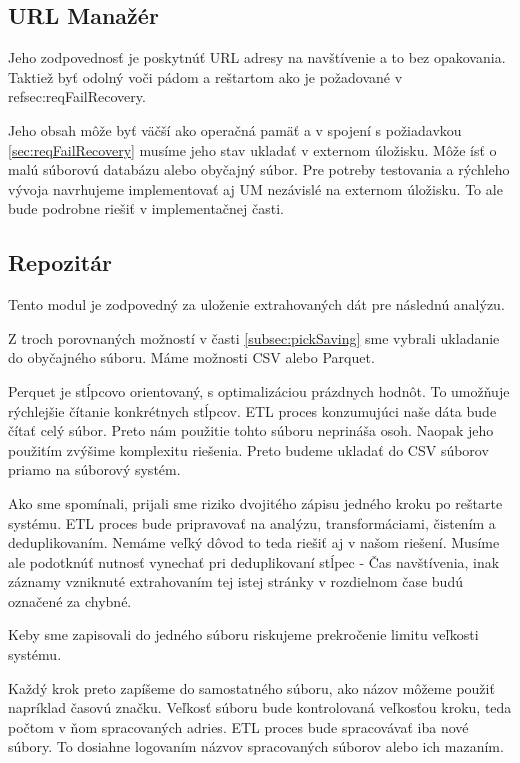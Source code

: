 \subsection{URL Manažér}
Jeho zodpovednosť je poskytnúť URL adresy na navštívenie a to bez opakovania. Taktiež byť odolný voči pádom a reštartom ako je požadované v ref{sec:reqFailRecovery}.

Jeho obsah môže byť väčší ako operačná pamäť a v spojení s požiadavkou \ref{sec:reqFailRecovery} musíme jeho stav ukladať v externom úložisku. Môže ísť o malú súborovú databázu alebo obyčajný súbor. Pre potreby testovania a rýchleho vývoja navrhujeme implementovať aj UM nezávislé na externom úložisku. To ale bude podrobne riešiť v implementačnej časti. 




\subsection{Repozitár}
Tento modul je zodpovedný za uloženie extrahovaných dát pre následnú analýzu. 

Z troch porovnaných možností v časti \ref{subsec:pickSaving} sme vybrali ukladanie do obyčajného súboru. Máme možnosti CSV alebo Parquet. 

Perquet je stĺpcovo orientovaný, s optimalizáciou prázdnych hodnôt. To umožňuje rýchlejšie čítanie konkrétnych stĺpcov. ETL proces konzumujúci naše dáta bude čítať celý súbor. Preto nám použitie tohto súboru neprináša osoh. Naopak jeho použitím zvýšime komplexitu riešenia. Preto budeme ukladať do CSV súborov priamo na súborový systém. 

Ako sme spomínali, prijali sme riziko dvojitého zápisu jedného kroku po reštarte systému. ETL proces bude pripravovať na analýzu, transformáciami, čistením a deduplikovaním. Nemáme veľký dôvod to teda riešiť aj v našom riešení. Musíme ale podotknúť nutnosť vynechať pri deduplikovaní stĺpec - Čas navštívenia, inak záznamy vzniknuté extrahovaním tej istej stránky v rozdielnom čase budú označené za chybné. 

Keby sme zapisovali do jedného súboru riskujeme prekročenie limitu veľkosti systému.

Každý krok preto zapíšeme do samostatného súboru, ako názov môžeme použiť napríklad časovú značku. Veľkosť súboru bude kontrolovaná veľkosťou kroku, teda počtom v ňom spracovaných adries. ETL proces bude spracovávať iba nové súbory. To dosiahne logovaním názvov spracovaných súborov alebo ich mazaním. 

